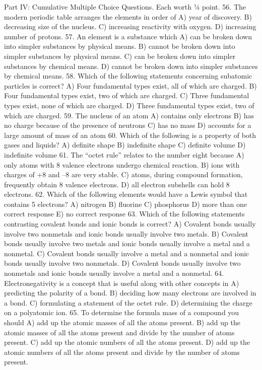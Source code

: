 \documentclass[addpoints, 12pt]{exam}
\begin{document}
\begin{questions}
Part IV: Cumulative Multiple Choice Questions.  Each worth ¼ point.
56.  The modern periodic table arranges the elements in order of
A)  year of discovery.
B)  decreasing size of the nucleus.
C)  increasing reactivity with oxygen.
D)  increasing number of protons.
57.  An element is a substance which
A)  can be broken down into simpler substances by physical means.
B)  cannot be broken down into simpler substances by physical means.
C)  can be broken down into simpler substances by chemical means.
D)  cannot be broken down into simpler substances by chemical means.
58.  Which of the following statements concerning subatomic particles is correct?
A)  Four fundamental types exist, all of which are charged.
B)   Four fundamental types exist, two of which are charged.
C)  Three fundamental types exist, none of which are charged.
D)  Three fundamental types exist, two of which are charged.
59.  The nucleus of an atom
A)  contains only electrons
B)  has no charge because of the presence of neutrons
C)  has no mass
D)  accounts for a large amount of mass of an atom
60.  Which of the following is a property of both gases and liquids?
A)  definite shape
B)  indefinite shape
C)  definite volume
D)  indefinite volume
61.  The “octet rule” relates to the number eight because
A)  only atoms with 8 valence electrons undergo chemical reaction.
B)  ions with charges of +8 and –8 are very stable.
C)  atoms, during compound formation, frequently obtain 8 valence electrons.
D)  all electron subshells can hold 8 electrons.
62.  Which of the following elements would have a Lewis symbol that contains 5 electrons?
A)	nitrogen
B)	fluorine
C)	phosphorus
D)	more than one correct response
E)	no correct response
63.  Which of the following statements contrasting covalent bonds and  ionic bonds is correct?
A)	Covalent bonds usually involve two nonmetals and ionic bonds usually involve two metals.
B)	Covalent bonds usually involve two metals and ionic bonds usually involve a metal and a nonmetal.
C)	Covalent bonds usually involve a metal and a nonmetal and ionic bonds usually involve two nonmetals.
D)	Covalent bonds usually involve two nonmetals and ionic bonds usually involve a metal and a nonmetal.
64.  Electronegativity is a concept that is useful along with other concepts in
A)	predicting the polarity of a bond.
B)	deciding how many electrons are involved in a bond.
C)	formulating a statement of the octet rule.
D)	determining the charge on a polyatomic ion.
65.  To determine the formula mass of a compound you should
A)	add up the atomic masses of all the atoms present.
B)	add up the atomic masses of all the atoms present and divide by the number of atoms present.
C)	add up the atomic numbers of all the atoms present.
D)	add up the atomic numbers of all the atoms present and divide by the number of atoms present.




\end{questions}
\end{document}
